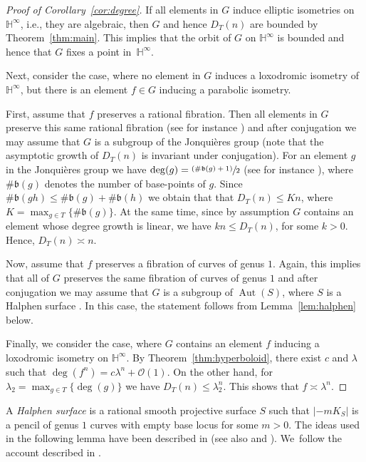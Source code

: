 \documentclass[11pt]{article}
\newcommand{\ie}{i.e.,\xspace}
\numberwithin{equation}{section}
\newcommand{\psfrac}[2]{\sfrac{(#1)}{#2}}
\newcommand{\h}{\operatorname{\mathbb{H}^{\infty}}}
\newcommand{\bp}{\mathfrak{b}}
\newcommand{\Aut}{\operatorname{Aut}}
\theoremstyle{plain}
\theoremstyle{definition}
\begin{document}
\begin{proof}[Proof of Corollary~\ref{cor:degree}]
If all elements in $G$ induce elliptic isometries on $\h$, \ie they are algebraic, then $G$ and hence $D_T(n)$ are bounded by Theorem~\ref{thm:main}. This implies that the orbit of $G$ on $\h$ is bounded and hence that $G$ fixes a point in~$\h$.

Next, consider the case, where no element in $G$ induces a loxodromic isometry of~$\h$, but there is an element $f\in G$ inducing a parabolic isometry.

First, assume that $f$ preserves a rational fibration. Then all elements in $G$ preserve this same rational fibration (see for instance \cite[Lem.\,5.3.4]{urech2017subgroups}) and after conjugation we may assume that $G$ is a subgroup of the Jonquières group (note that the asymptotic growth of $D_T(n)$ is invariant under conjugation). For an element $g$ in the Jonquières group we have $\deg(g)=\psfrac{\#\bp(g)+1}{2}$ (see for instance \cite{Lamy_Cremona}), where $\#\bp(g)$ denotes the number of base-points of $g$. Since $\#\bp(gh)\leq \#\bp(g)+\#\bp(h)$ we obtain that that $D_T(n)\leq Kn$, where $K=\max_{g\in T}\{\#\bp(g)\}$. At the same time, since by assumption $G$ contains an element whose degree growth is linear, we have $kn\leq D_T(n)$, for some $k>0$. Hence, $D_T(n)\asymp n$.

Now, assume that $f$ preserves a fibration of curves of genus $1$. Again, this implies that all of $G$ preserves the same fibration of curves of genus $1$ and after conjugation we may assume that $G$ is a subgroup of $\Aut(S)$, where $S$ is a Halphen surface \cite[Lem.\,5.3.4]{urech2017subgroups}. In this case, the statement follows from Lemma~\ref{lem:halphen} below.

Finally, we consider the case, where $G$ contains an element $f$ inducing a loxodromic isometry on $\h$. By Theorem~\ref{thm:hyperboloid}, there exist $c$ and $\lambda$ such that $\deg(f^n)=c\lambda^n+\mathcal{O}(1)$. On the other hand, for $\lambda_2=\max_{g\in T}\{\deg(g)\}$ we have $D_T(n)\leq \lambda_2^n$. This shows that $f\asymp \lambda^n$.
\end{proof}

A \emph{Halphen surface} is a rational smooth projective surface $S$ such that $|{-}mK_S|$ is a pencil of genus $1$ curves with empty base locus for some $m>0$. The ideas used in the following lemma have been described in \cite{gizatullin1980rational} (see also \cite{grivaux2013parabolic} and \cite{cantat2012rational}). We~follow the account described in \cite{Lamy_Cremona}.
\end{document}
